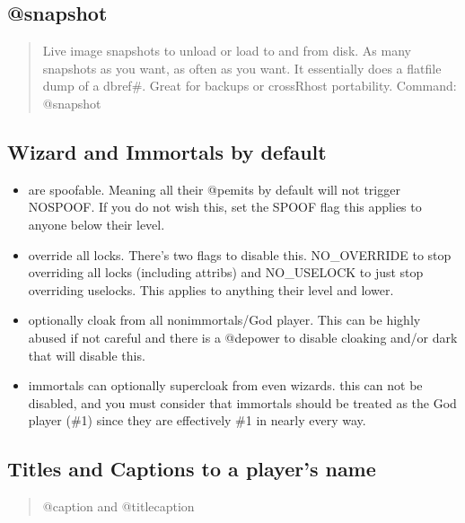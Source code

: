 \documentclass[letterpaper,10pt,english]{sphinxmanual}
\begin{document}
\subsection{@snapshot}
\label{\detokenize{features:snapshot}}\begin{quote}

\sphinxAtStartPar
Live image snapshots to unload or load to and from
disk.  As many snapshots as you want, as often as you want.
It essentially does a flatfile dump of a dbref\#.  Great for
backups or cross\sphinxhyphen{}Rhost portability.
Command: @snapshot
\end{quote}


\subsection{Wizard and Immortals by default}
\label{\detokenize{features:wizard-and-immortals-by-default}}\begin{itemize}
\item {} 
\sphinxAtStartPar
are spoofable.  Meaning all their @pemits by default will not
trigger NOSPOOF.  If you do not wish this, set the SPOOF flag
this applies to anyone below their level.

\item {} 
\sphinxAtStartPar
override all locks.  There’s two flags to disable this.
NO\_OVERRIDE to stop overriding all locks (including attribs)
and NO\_USELOCK to just stop overriding uselocks.
This applies to anything their level and lower.

\item {} 
\sphinxAtStartPar
optionally cloak from all non\sphinxhyphen{}immortals/God player.
This can be highly abused if not careful and there
is a @depower to disable cloaking and/or dark that will
disable this.

\item {} 
\sphinxAtStartPar
immortals can optionally supercloak from even wizards.
this can not be disabled, and you must consider that immortals
should be treated as the God player (\#1) since they are
effectively \#1 in nearly every way.

\end{itemize}


\subsection{Titles and Captions to a player’s name}
\label{\detokenize{features:titles-and-captions-to-a-player-s-name}}\begin{quote}

\sphinxAtStartPar
@caption and @titlecaption
\end{quote}
\end{document}
